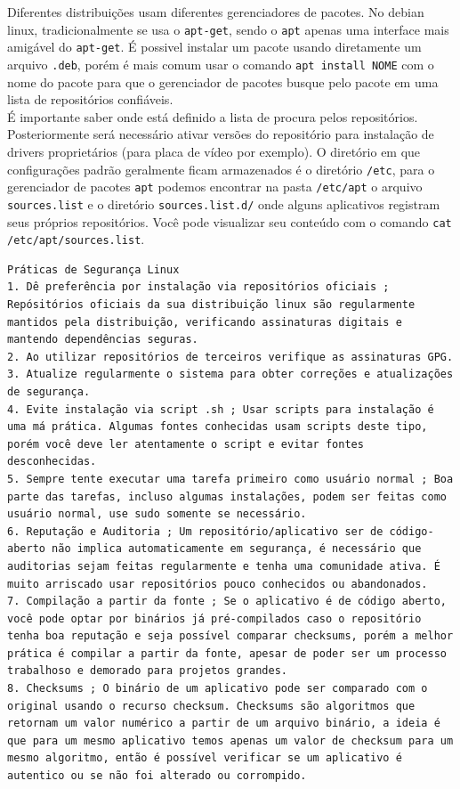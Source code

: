 \documentclass[12pt,a4paper]{article}
\begin{document}
\vspace{\baselineskip}

Diferentes distribuições usam diferentes gerenciadores de pacotes. No debian linux, tradicionalmente se usa o \texttt{apt-get}, sendo o \texttt{apt} apenas uma interface mais amigável do \texttt{apt-get}. É possivel instalar um pacote usando diretamente um arquivo \texttt{.deb}, porém é mais comum usar o comando \texttt{apt install NOME} com o nome do pacote para que o gerenciador de pacotes busque pelo pacote em uma lista de repositórios confiáveis.\\

É importante saber onde está definido a lista de procura pelos repositórios. Posteriormente será necessário ativar versões do repositório para instalação de drivers proprietários (para placa de vídeo por exemplo). O diretório em que configurações padrão geralmente ficam armazenados é o diretório \texttt{/etc}, para o gerenciador de pacotes \texttt{apt} podemos encontrar na pasta \texttt{/etc/apt} o arquivo \texttt{sources.list} e o diretório \texttt{sources.list.d/} onde alguns aplicativos registram seus próprios repositórios. Você pode visualizar seu conteúdo com o comando \texttt{cat /etc/apt/sources.list}.\\

\begin{lstlisting}
Práticas de Segurança Linux 
1. Dê preferência por instalação via repositórios oficiais ; Repósitórios oficiais da sua distribuição linux são regularmente mantidos pela distribuição, verificando assinaturas digitais e mantendo dependências seguras.
2. Ao utilizar repositórios de terceiros verifique as assinaturas GPG.
3. Atualize regularmente o sistema para obter correções e atualizações de segurança.
4. Evite instalação via script .sh ; Usar scripts para instalação é uma má prática. Algumas fontes conhecidas usam scripts deste tipo, porém você deve ler atentamente o script e evitar fontes desconhecidas. 
5. Sempre tente executar uma tarefa primeiro como usuário normal ; Boa parte das tarefas, incluso algumas instalações, podem ser feitas como usuário normal, use sudo somente se necessário.
6. Reputação e Auditoria ; Um repositório/aplicativo ser de código-aberto não implica automaticamente em segurança, é necessário que auditorias sejam feitas regularmente e tenha uma comunidade ativa. É muito arriscado usar repositórios pouco conhecidos ou abandonados. 
7. Compilação a partir da fonte ; Se o aplicativo é de código aberto, você pode optar por binários já pré-compilados caso o repositório tenha boa reputação e seja possível comparar checksums, porém a melhor prática é compilar a partir da fonte, apesar de poder ser um processo trabalhoso e demorado para projetos grandes. 
8. Checksums ; O binário de um aplicativo pode ser comparado com o original usando o recurso checksum. Checksums são algoritmos que retornam um valor numérico a partir de um arquivo binário, a ideia é que para um mesmo aplicativo temos apenas um valor de checksum para um mesmo algoritmo, então é possível verificar se um aplicativo é autentico ou se não foi alterado ou corrompido. 
\end{lstlisting}
\end{document}
